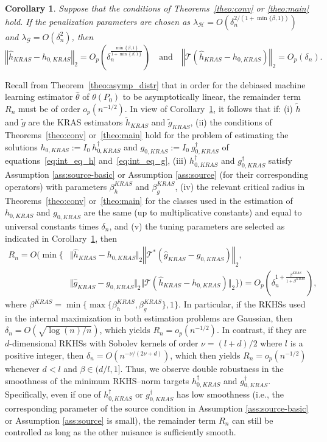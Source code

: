 \documentclass[twoside,11pt]{article}
\newtheorem{corollary}{Corollary}
\newcommand{\mc}{\mathcal}
\begin{document}
\begin{corollary}
   Suppose that the conditions of Theorems~\ref{theo:conv} or \ref{theo:main} hold. If the penalization parameters are chosen as $\lambda_{\mc{H}}=O(\delta_n^{2/(1+\min\{\beta,1\})})$ and $\lambda_{\mc{G}}=O\left(\delta_n^2\right)$, then
    \[
    \left\Vert \hat {h}_{KRAS}-h_{0,KRAS}\right\Vert_2=O_p\left(\delta_n^{\frac{\min\left\{\beta,1\right\}}{1+\min\left\{\beta,1\right\}}}\right)\quad\text{and}\quad \left\Vert \mc{T}(\hat {h}_{KRAS}-h_{0,KRAS})\right\Vert_2=O_p\left(\delta_n\right).
    \] \label{coro:optimal_lambda}
\end{corollary}
Recall from Theorem~\ref{theo:asymp_distr} that in order for the debiased machine learning estimator $\hat\theta$ of $\theta(P_0)$ to be asymptotically linear, the remainder term $R_n$ must be of order $o_p(n^{-1/2})$. In view of Corollary~\ref{coro:optimal_lambda}, it follows that if: (i) $\tilde h$ and $\tilde g$ are the KRAS estimators $\tilde {h}_{KRAS}$ and $\tilde {g}_{KRAS}$, (ii) the conditions of Theorems~\ref{theo:conv} or~\ref{theo:main} hold for the problem of estimating the solutions $h_{0,KRAS}:=I_0 \: h_{0,KRAS}^\dag$ and $g_{0,KRAS}:=I_0\:g_{0,KRAS}^\dag$ of equations~\eqref{eq:int_eq_h} and~\eqref{eq:int_eq_g}, (iii) $h_{0,KRAS}^\dag$ and $g_{0,KRAS}^\dag$ satisfy Assumption \ref{ass:source-basic} or Assumption \ref{ass:source} (for their corresponding operators) with parameters $\beta_h^{KRAS}$ and $\beta_g^{KRAS}$, (iv) the relevant critical radius in Theorems~\ref{theo:conv} or~\ref{theo:main} for the classes used in the estimation of $h_{0,KRAS}$ and $g_{0,KRAS}$ are the same (up to multiplicative constants) and equal to universal constants times $\delta_n$, and (v) the tuning parameters are selected as indicated in Corollary~\ref{coro:optimal_lambda}, then 
\begin{align*}
R_n = O(\min \{& \Vert \hat {h}_{KRAS}-h_{0,KRAS}\Vert_2 \left\Vert\mc{T}^*( \hat {g}_{KRAS}-g_{0,KRAS})\right\Vert_2,\\
&\Vert \hat {g}_{KRAS}-g_{0,KRAS}\Vert_2 \Vert\mc{T}( \hat {h}_{KRAS}-h_{0,KRAS})\Vert_2 \})= O_p\left(\delta_n^{1+\frac{\beta^{KRAS}}{1+\beta^{KRAS}}}\right),
\end{align*}
where $\beta^{KRAS}=\min\{\max\{\beta_h^{KRAS},\beta_g^{KRAS}\}, 1\}$. In particular, if the RKHSs used in the internal maximization in both estimation problems are Gaussian, then $\delta_n = O(\sqrt{\log(n)/n})$, which yields $R_n = o_p(n^{-1/2})$. In contrast, if they are $d$-dimensional RKHSs with Sobolev kernels of order $\nu=(l+d)/2$ where $l$ is a positive integer, then $\delta_n = O(n^{-\nu/(2\nu+d)})$, which then yields $R_n = o_p(n^{-1/2})$ whenever $d<l$ and $\beta\in(d/l,1]$. 
Thus, we observe double robustness in the smoothness of the minimum RKHS--norm targets $h_{0,KRAS}^\dagger$ and $g_{0,KRAS}^\dagger$. Specifically, even if one of $h_{0,KRAS}^\dag$ or $g_{0,KRAS}^\dag$ has low smoothness (i.e., the corresponding parameter of the source condition in Assumption \ref{ass:source-basic} or Assumption \ref{ass:source} is small), the remainder term $R_n$ can still be controlled as long as the other nuisance is sufficiently smooth. 
\end{document}
